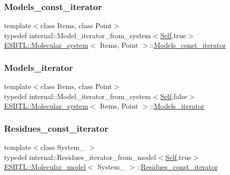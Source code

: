 \mbox{\label{group__grp__iters_ga6383c53b86af7a7a7376bce06e4febb8}} 
\subsubsection{\texorpdfstring{Models\+\_\+const\+\_\+iterator}{Models\_const\_iterator}}
{\footnotesize\ttfamily template$<$class Items, class Point$>$ \\
typedef internal\+::\+Model\+\_\+iterator\+\_\+from\+\_\+system$<$\hyperlink{classESBTL_1_1Molecular__system}{Self},true$>$ \hyperlink{classESBTL_1_1Molecular__system}{E\+S\+B\+T\+L\+::\+Molecular\+\_\+system}$<$ Items, Point $>$\+::\hyperlink{group__grp__iters_ga6383c53b86af7a7a7376bce06e4febb8}{Models\+\_\+const\+\_\+iterator}}

\mbox{\label{group__grp__iters_ga752760df14baf1b92dac469d712202bc}} 
\subsubsection{\texorpdfstring{Models\+\_\+iterator}{Models\_iterator}}
{\footnotesize\ttfamily template$<$class Items, class Point$>$ \\
typedef internal\+::\+Model\+\_\+iterator\+\_\+from\+\_\+system$<$\hyperlink{classESBTL_1_1Molecular__system}{Self},false$>$ \hyperlink{classESBTL_1_1Molecular__system}{E\+S\+B\+T\+L\+::\+Molecular\+\_\+system}$<$ Items, Point $>$\+::\hyperlink{group__grp__iters_ga752760df14baf1b92dac469d712202bc}{Models\+\_\+iterator}}

\mbox{\label{group__grp__iters_gab9417777a325c8ca02089328a4468703}} 
\subsubsection{\texorpdfstring{Residues\+\_\+const\+\_\+iterator}{Residues\_const\_iterator}\hspace{0.1cm}{\footnotesize\ttfamily [1/2]}}
{\footnotesize\ttfamily template$<$class System\+\_\+ $>$ \\
typedef internal\+::\+Residues\+\_\+iterator\+\_\+from\+\_\+model$<$\hyperlink{classESBTL_1_1Molecular__model}{Self},true$>$ \hyperlink{classESBTL_1_1Molecular__model}{E\+S\+B\+T\+L\+::\+Molecular\+\_\+model}$<$ System\+\_\+ $>$\+::\hyperlink{group__grp__iters_gab9417777a325c8ca02089328a4468703}{Residues\+\_\+const\+\_\+iterator}}

